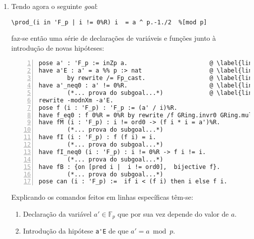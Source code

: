 \begin{enumerate}[label=\textbf{\roman*.}]
        \item Tendo agora o seguinte \textit{goal}:
                \begin{lstlisting}[language=coq,frame=single,tabsize=1]
\prod_(i in 'F_p | i != 0%R) i  = a ^ p.-1./2  %[mod p]
                \end{lstlisting}
        faz-se então uma série de declarações de variáveis e funções junto à introdução de novas hipóteses:
                \begin{lstlisting}[language=coq,frame=single, numbers=left,stepnumber=1,tabsize=1,escapechar=@, name=proof]
pose a' : 'F_p := inZp a.                       @ \label{line:4-item2} @
have a'E : a' = a %% p :> nat                   @ \label{line:5-item2} @
        by rewrite /= Fp_cast.                  @ \label{line:6-item2} @
have a'_neq0 : a' != 0%R.                       @ \label{line:7-item2} @
        (*... prova do subgoal...*)             @ \label{line:8-item2} @
rewrite -modnXm -a'E.                                                   @ \label{line:9-item2} @
pose f (i : 'F_p) : 'F_p := (a' / i)%R.                                 @ \label{line:10-item2} @
have f_eq0 : f 0%R = 0%R by rewrite /f GRing.invr0 GRing.mulr0.         @ \label{line:11-item2} @
have fM (i : 'F_p) : i != ord0 -> (f i * i = a')%R.                     @ \label{line:12-item2} @
        (*... prova do subgoal...*)                                     @ \label{line:13-item2} @
have fI (i : 'F_p) : f (f i) = i.                                       @ \label{line:14-item2} @
        (*... prova do subgoal...*)                                     @ \label{line:15-item2} @
have fI_neq0 (i : 'F_p) : i != 0%R -> f i != i.                         @ \label{line:16-item2} @
        (*... prova do subgoal...*)                                     @ \label{line:17-item2} @
have fB : {on [pred i |  i != ord0],  bijective f}.                     @ \label{line:18-item2} @
        (*... prova do subgoal...*)                                     @ \label{line:19-item2} @
pose can (i : 'F_p) :=  if i < (f i) then i else f i.                   @ \label{line:20-item2} @
                \end{lstlisting}
        Explicando os comandos feitos em linhas específicas têm-se:
        \begin{enumerate}
                \item[\textbf{(\ref{line:4-item2})}] Declaração da variável $a' \in \mathbb{F}_p$ que por sua vez depende do valor de $a$.
                
                \item[\textbf{(\ref{line:5-item2})}] Introdução da hipótese \lstinline[language=coq]|a'E| de que $a' = a \bmod{p}$.
                

\end{enumerate}
\end{enumerate}
